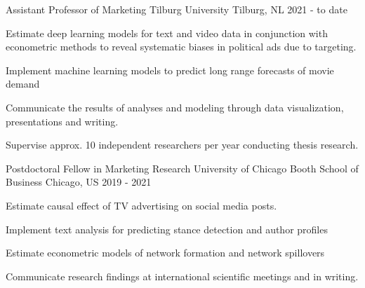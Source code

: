 \begin{section}[Experience]

  \entry%
  {Assistant Professor of Marketing} %
  {Tilburg University} %
  {Tilburg, NL} %
  {2021 - to date} %
  {%
    \begin{entrylist}
      \item Estimate deep learning models for text and video data in conjunction with econometric methods to reveal systematic biases in political ads due to targeting. 
      \item Implement machine learning models to predict long range forecasts of movie demand
      \item Communicate the results of analyses and modeling through data visualization, presentations and writing.
      \item Supervise approx. 10 independent researchers per year conducting thesis research.
    \end{entrylist}
  }%


  \entry%
  {Postdoctoral Fellow in Marketing Research} %
  {University of Chicago Booth School of Business} %
  {Chicago, US} %
  {2019 - 2021} %
  {%
    \begin{entrylist}
      \item Estimate causal effect of TV advertising on social media posts.
      \item Implement text analysis for predicting stance detection and author profiles
      \item Estimate econometric models of network formation and network spillovers 
      \item Communicate research findings at international scientific meetings and in writing.
    \end{entrylist}
  }%
  

\end{section}
